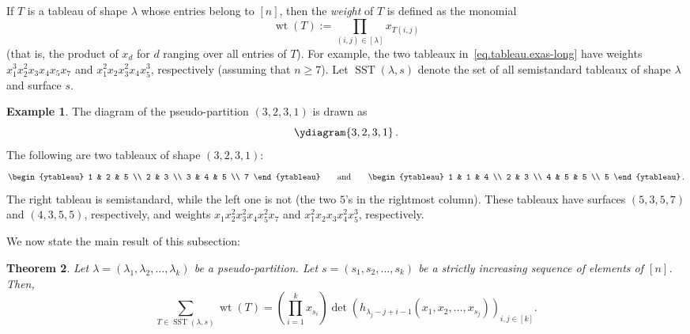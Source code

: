\documentclass[reqno]{amsart}
\newcommand{\0}{\phantom{c}}
\newcommand{\diag}[1]{\left[#1\right]} %
\DeclareMathOperator{\wt}{wt} %
\DeclareMathOperator{\SST}{SST} %
\let\sumnonlimits\sum
\let\prodnonlimits\prod
\renewcommand{\sum}{\sumnonlimits\limits}
\renewcommand{\prod}{\prodnonlimits\limits}
\newenvironment{verlong}{}{}
\newcommand{\tup}[1]{\left( #1 \right)}
\newcommand{\ive}[1]{\left[ #1 \right]}
\newcommand{\defn}[1]{{\color{darkred}\emph{#1}}} %
\theoremstyle{plain}
\newtheorem{thm}{Theorem}[section]
\theoremstyle{definition}
\newtheorem{example}[thm]{Example}
\numberwithin{equation}{section}
\begin{document}
If $T$ is a tableau of shape $\lambda$ whose entries belong to $\ive{n}$, then the \defn{weight} of $T$ is defined as the monomial
\[
\wt(T) := \prod_{(i,j) \in \diag{\lambda}} x_{T(i,j)}
\]
(that is, the product of $x_{d}$ for $d$ ranging over all entries of $T$).
\begin{verlong}
For example, the two tableaux in~\eqref{eq.tableau.exas-long} have weights $x_1^{3}x_2^{2}x_{3}x_{4}x_{5}x_{7}$ and $x_1^{2}x_2x_{3}^{2}x_{4}x_{5}^{3}$, respectively (assuming that $n \geq 7$).
\end{verlong}
Let $\SST(\lambda, s)$ denote the set of all semistandard tableaux of shape $\lambda$ and surface $s$.

\begin{example}
The diagram of the pseudo-partition $\tup{3,2,3,1}$ is drawn as
\[
\ydiagram{3,2,3,1}\,.
\]
The following are two tableaux of shape $\tup{3,2,3,1}$:
\[
\label{eq.tableau.exas}
\begin{ytableau} 1 & 2 & 5 \\ 2 & 3 \\ 3 & 4 & 5 \\ 7 \end{ytableau}\qquad
\text{and}\qquad
\begin{ytableau} 1 & 1 & 4 \\ 2 & 3 \\ 4 & 5 & 5 \\ 5 \end{ytableau}\,.
\]
The right tableau is semistandard, while the left one is not (the two $5$'s in the rightmost column).
These tableaux have surfaces $(5,3,5,7)$ and $(4,3,5,5)$, respectively, and weights $x_1 x_2^2 x_3^2 x_4 x_5^2 x_7$ and $x_1^2 x_2 x_3 x_4^2 x_5^3$, respectively.
\end{example}

We now state the main result of this subsection:

\begin{thm}
\label{thm.tableau.jt}
Let $\lambda = \tup{\lambda_1, \lambda_2, \dotsc, \lambda_k}$ be a pseudo-partition.
Let $s = \tup{s_1, s_2, \dotsc, s_k}$ be a strictly increasing sequence of elements of $\ive{n}$.
Then,
\[
\sum_{T \in \SST(\lambda, s)} \wt(T) = \left(  \prod_{i=1}^{k} x_{s_i} \right)  \det\left(  h_{\lambda_j-j+i-1}(  x_1,x_2,\ldots,x_{s_j})  \right)_{i, j \in \ive{k}} .
\]
\end{thm}
\end{document}
